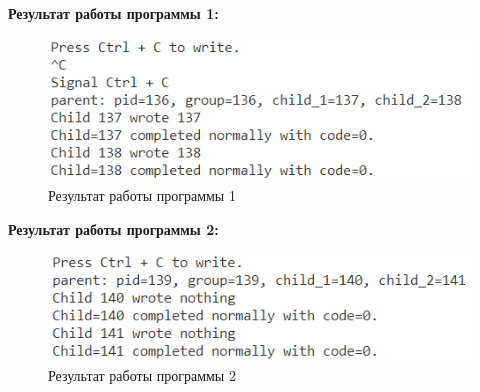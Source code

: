 \documentclass[14pt, a4paper]{extarticle}
\begin{document}
\newpage
\textbf{Результат работы программы 1:}\par
\begin{figure}[h!]
	\centering
	\includegraphics[width=\textwidth]{source/5.1.png}
	\caption{Результат работы программы 1}
	\label{Example5.1}
\end{figure}\par
\textbf{Результат работы программы 2:}\par
\begin{figure}[h!]
	\centering
	\includegraphics[width=\textwidth]{source/5.2.png}
	\caption{Результат работы программы 2}
	\label{Example5.2}
\end{figure}\par
\end{document}
